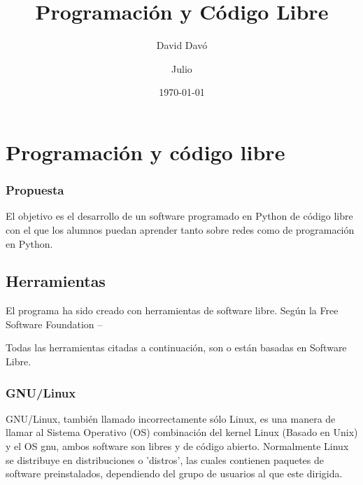 \documentclass[a4paper, 11pt, twoside]{report} %
\title{Programación y Código Libre}
\author{David Davó \and Julio}
\date{\today{}}
\begin{document}
\begin{titlepage}
{\Large\maketitle}
\end{titlepage}
\clearpage

\tableofcontents
\newpage{}

\chapter{Programación y código libre}

\subsection*{Propuesta}
El objetivo es el desarrollo de un software programado en Python de código libre con el que los alumnos puedan aprender tanto sobre redes como de programación en Python.

\section{Herramientas}
El programa ha sido creado con herramientas de software libre. Según la Free Software Foundation
--\cite{FSF-Ph}

Todas las herramientas citadas a continuación, son o están basadas en Software Libre.

\subsection{GNU/Linux}
GNU/Linux, también llamado incorrectamente sólo Linux, es una manera de llamar al Sistema Operativo (OS) combinación del kernel Linux (Basado en Unix) y el OS \gls{gnu}, ambos software son libres y de código abierto. Normalmente Linux se distribuye en distribuciones o 'distros', las cuales contienen paquetes de software preinstalados, dependiendo del grupo de usuarios al que este dirigida.
\end{document}
